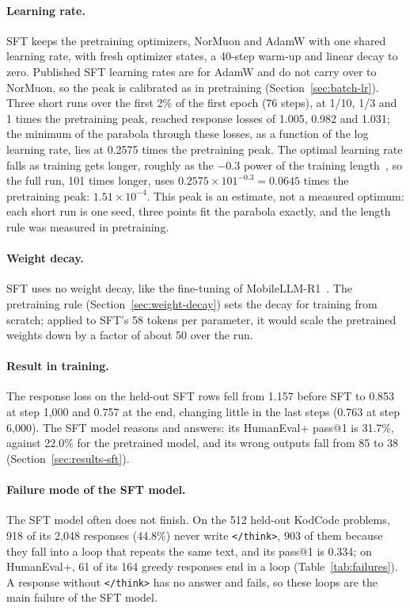 \documentclass[sigconf,nonacm,balance=false]{acmart}
\begin{document}
\paragraph{Learning rate.} SFT keeps the pretraining optimizers, NorMuon and AdamW with one shared learning rate, with
fresh optimizer states, a 40-step warm-up and linear decay to zero. Published SFT learning rates are for AdamW and do
not carry over to NorMuon, so the peak is calibrated as in pretraining (Section~\ref{sec:batch-lr}). Three short runs
over the first 2\% of the first epoch (76 steps), at 1/10, 1/3 and 1 times the pretraining peak, reached response
losses of 1.005, 0.982 and 1.031; the minimum of the parabola through these losses, as a function of the log learning
rate, lies at 0.2575 times the pretraining peak. The optimal learning rate falls as training gets longer, roughly as
the $-0.3$ power of the training length~\cite{bjorck2024horizons}, so the full run, 101 times longer, uses
$0.2575 \times 101^{-0.3} = 0.0645$ times the pretraining peak: $1.51 \times 10^{-4}$. This peak is an estimate, not a
measured optimum: each short run is one seed, three points fit the parabola exactly, and the length rule was measured
in pretraining.

\paragraph{Weight decay.} SFT uses no weight decay, like the fine-tuning of MobileLLM-R1~\cite{zhao2025mobilellmr1}.
The pretraining rule (Section~\ref{sec:weight-decay}) sets the decay for training from scratch; applied to SFT's 58
tokens per parameter, it would scale the pretrained weights down by a factor of about 50 over the run.

\paragraph{Result in training.} The response loss on the held-out SFT rows fell from 1.157 before SFT to 0.853 at step
1,000 and 0.757 at the end, changing little in the last steps (0.763 at step 6,000). The SFT model reasons and
answers: its HumanEval+ pass@1 is 31.7\%, against 22.0\% for the pretrained model, and its wrong outputs fall from 85
to 38 (Section~\ref{sec:results-sft}).

\paragraph{Failure mode of the SFT model.} The SFT model often does not finish. On the 512 held-out KodCode problems,
918 of its 2,048 responses (44.8\%) never write \texttt{</think>}, 903 of them because they fall into a loop that
repeats the same text, and its pass@1 is 0.334; on HumanEval+, 61 of its 164 greedy responses end in a loop
(Table~\ref{tab:failures}). A response without \texttt{</think>} has no answer and fails, so these loops are the main
failure of the SFT model.
\end{document}
